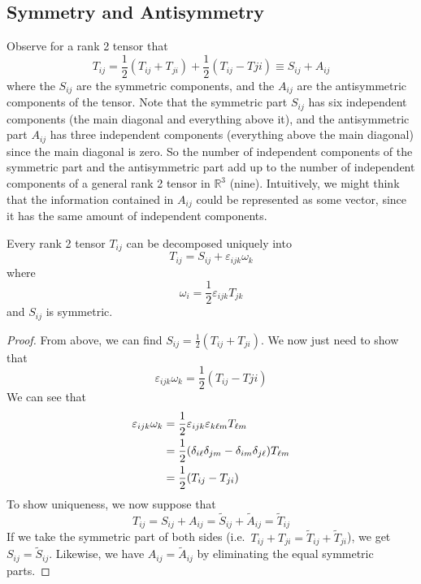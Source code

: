 \subsection{Symmetry and Antisymmetry}
Observe for a rank 2 tensor that
\[
	T_{ij} = \frac{1}{2}\left( T_{ij} + T_{ji} \right) + \frac{1}{2}\left( T_{ij} - T{ji} \right) \equiv S_{ij} + A_{ij}
\]
where the \(S_{ij}\) are the symmetric components, and the \(A_{ij}\) are the antisymmetric components of the tensor.
Note that the symmetric part \(S_{ij}\) has six independent components (the main diagonal and everything above it), and the antisymmetric part \(A_{ij}\) has three independent components (everything above the main diagonal) since the main diagonal is zero.
So the number of independent components of the symmetric part and the antisymmetric part add up to the number of independent components of a general rank 2 tensor in \(\mathbb R^3\) (nine).
Intuitively, we might think that the information contained in \(A_{ij}\) could be represented as some vector, since it has the same amount of independent components.
\begin{proposition}
	Every rank 2 tensor \(T_{ij}\) can be decomposed uniquely into
	\[
		T_{ij} = S_{ij} + \varepsilon_{ijk} \omega_k
	\]
	where
	\[
		\omega_i = \frac{1}{2}\varepsilon_{ijk} T_{jk}
	\]
	and \(S_{ij}\) is symmetric.
\end{proposition}
\begin{proof}
	From above, we can find \(S_{ij} = \frac{1}{2}\left( T_{ij} + T_{ji} \right)\).
	We now just need to show that
	\[
		\varepsilon_{ijk} \omega_k = \frac{1}{2}\left( T_{ij} - T{ji} \right)
	\]
	We can see that
	\begin{align*}
		\varepsilon_{ijk} \omega_k & = \frac{1}{2}\varepsilon_{ijk} \varepsilon_{k\ell m} T_{\ell m}                      \\
		                           & = \frac{1}{2}\qty(\delta_{i\ell} \delta_{jm} - \delta_{im}\delta_{j\ell}) T_{\ell m} \\
		                           & = \frac{1}{2}\qty(T_{ij} - T_{ji})
	\end{align*}
	To show uniqueness, we now suppose that
	\[
		T_{ij} = S_{ij} + A_{ij} = \widetilde{S}_{ij} + \widetilde{A}_{ij} = \widetilde{T}_{ij}
	\]
	If we take the symmetric part of both sides (i.e.\ \(T_{ij} + T_{ji} = \widetilde{T}_{ij} + \widetilde{T}_{ji}\)), we get \(S_{ij} = \widetilde{S}_{ij}\).
	Likewise, we have \(A_{ij} = \widetilde{A}_{ij}\) by eliminating the equal symmetric parts.
\end{proof}
